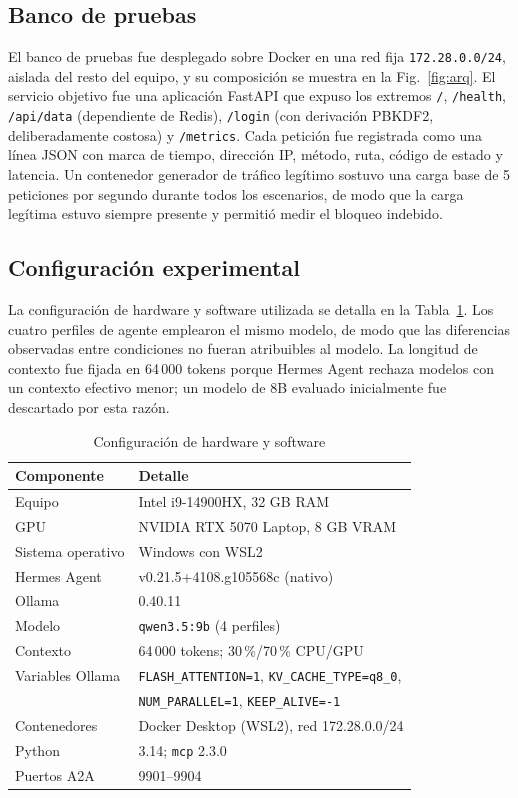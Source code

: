 \documentclass[conference]{IEEEtran}
\begin{document}
\subsection{Banco de pruebas}
El banco de pruebas fue desplegado sobre Docker en una red fija
\texttt{172.28.0.0/24}, aislada del resto del equipo, y su composición se muestra en
la Fig.~\ref{fig:arq}. El servicio objetivo fue una aplicación FastAPI que expuso
los extremos \texttt{/}, \texttt{/health}, \texttt{/api/data} (dependiente de
Redis), \texttt{/login} (con derivación PBKDF2, deliberadamente costosa) y
\texttt{/metrics}. Cada petición fue registrada como una línea JSON con marca de
tiempo, dirección IP, método, ruta, código de estado y latencia. Un contenedor
generador de tráfico legítimo sostuvo una carga base de 5 peticiones por segundo
durante todos los escenarios, de modo que la carga legítima estuvo siempre presente
y permitió medir el bloqueo indebido.

\subsection{Configuración experimental}
La configuración de hardware y software utilizada se detalla en la
Tabla~\ref{tab:setup}. Los cuatro perfiles de agente emplearon el mismo modelo, de
modo que las diferencias observadas entre condiciones no fueran atribuibles al
modelo. La longitud de contexto fue fijada en 64\,000 tokens porque Hermes Agent
rechaza modelos con un contexto efectivo menor; un modelo de 8B evaluado inicialmente
fue descartado por esta razón.

\begin{table}[htbp]
\caption{Configuración de hardware y software}
\begin{center}
\footnotesize
\begin{tabular}{@{}ll@{}}
\toprule
\textbf{Componente} & \textbf{Detalle} \\
\midrule
Equipo & Intel i9-14900HX, 32 GB RAM \\
GPU & NVIDIA RTX 5070 Laptop, 8 GB VRAM \\
Sistema operativo & Windows con WSL2 \\
Hermes Agent & v0.21.5+4108.g105568c (nativo) \\
Ollama & 0.40.11 \\
Modelo & \texttt{qwen3.5:9b} (4 perfiles) \\
Contexto & 64\,000 tokens; 30\,\%/70\,\% CPU/GPU \\
Variables Ollama & \texttt{FLASH\_ATTENTION=1}, \texttt{KV\_CACHE\_TYPE=q8\_0}, \\
 & \texttt{NUM\_PARALLEL=1}, \texttt{KEEP\_ALIVE=-1} \\
Contenedores & Docker Desktop (WSL2), red 172.28.0.0/24 \\
Python & 3.14; \texttt{mcp} 2.3.0 \\
Puertos A2A & 9901--9904 \\
\bottomrule
\end{tabular}
\label{tab:setup}
\end{center}
\end{table}
\end{document}
